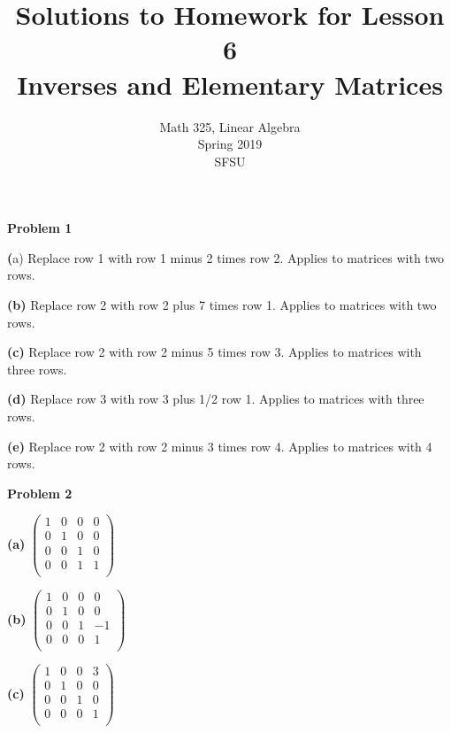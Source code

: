 \documentclass[oneside,12pt]{amsart}
\begin{document}
\title{Solutions to Homework for Lesson 6 \\ Inverses and Elementary Matrices}
\author{Math 325, Linear Algebra \\ Spring 2019 \\ SFSU }
\date{}

\maketitle


\textbf{Problem 1}

\bigskip

\textbf(a) Replace row 1 with row 1 minus 2 times row 2. Applies to matrices
with two rows.

\bigskip

\textbf{(b)} Replace row 2 with row 2 plus 7 times row 1. Applies to matrices
with two rows.

\bigskip

\textbf{(c)} Replace row 2 with row 2 minus 5 times row 3. Applies to matrices
with three rows.

\bigskip

\textbf{(d)} Replace row 3 with row 3 plus 1/2 row 1. Applies to matrices
with three rows.

\bigskip

\textbf{(e)} Replace row 2 with row 2 minus 3 times row 4. Applies to
matrices with 4 rows.

\bigskip

\textbf{Problem 2}

\bigskip

\textbf{(a)}
$
\begin{pmatrix}
1 & 0 & 0 & 0 \\
0 & 1 & 0 & 0 \\
0 & 0 & 1 & 0 \\
0 & 0 & 1 & 1 \\
\end{pmatrix}
$

\bigskip

\textbf{(b)}
$
\begin{pmatrix}
1 & 0 & 0 & 0 \\
0 & 1 & 0 & 0 \\
0 & 0 & 1 & -1 \\
0 & 0 & 0 & 1 \\
\end{pmatrix}
$

\bigskip

\textbf{(c)}
$
\begin{pmatrix}
1 & 0 & 0 & 3 \\
0 & 1 & 0 & 0 \\
0 & 0 & 1 & 0 \\
0 & 0 & 0 & 1 \\
\end{pmatrix}
$
\end{document}
